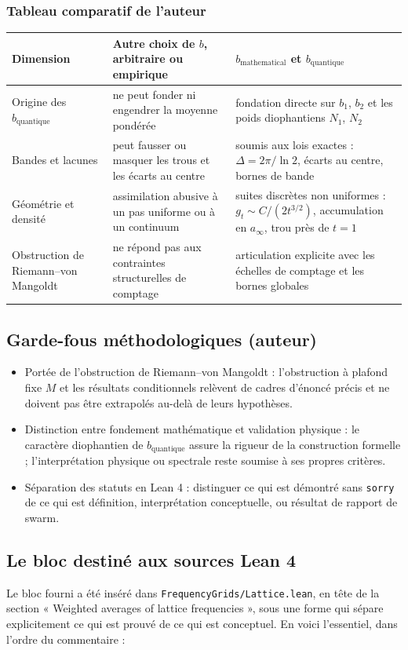 \documentclass[11pt,a4paper]{article}
\newcommand{\code}[1]{\texttt{#1}}
\newcommand{\itemization}[1]{\begin{itemize}[leftmargin=1.4em,itemsep=1pt,topsep=2pt]#1\end{itemize}}
\theoremstyle{definition}
\theoremstyle{remark}
\begin{document}
\subsubsection*{Tableau comparatif de l'auteur}
\begingroup\small
\begin{longtable}{@{}p{3.0cm}p{5.6cm}p{6.5cm}@{}}
\toprule
\textbf{Dimension} & \textbf{Autre choix de $b$, arbitraire ou empirique} & \textbf{$b_{\mathrm{mathematical}}$ et $b_{\mathrm{quantique}}$} \\
\midrule\endhead
Origine des $b_{\mathrm{quantique}}$ & ne peut fonder ni engendrer la moyenne pondérée & fondation directe sur $b_1$, $b_2$ et les poids diophantiens $N_1$, $N_2$ \\
Bandes et lacunes & peut fausser ou masquer les trous et les écarts au centre & soumis aux lois exactes : $\Delta = 2\pi/\ln 2$, écarts au centre, bornes de bande \\
Géométrie et densité & assimilation abusive à un pas uniforme ou à un continuum & suites discrètes non uniformes : $g_t \sim C/(2t^{3/2})$, accumulation en $a_\infty$, trou près de $t = 1$ \\
Obstruction de Riemann--von Mangoldt & ne répond pas aux contraintes structurelles de comptage & articulation explicite avec les échelles de comptage et les bornes globales \\
\bottomrule
\end{longtable}\endgroup

\subsection{Garde-fous méthodologiques (auteur)}
\itemization{
\item Portée de l'obstruction de Riemann--von Mangoldt : l'obstruction à plafond fixe $M$ et les résultats conditionnels relèvent de cadres d'énoncé précis et ne doivent pas être extrapolés au-delà de leurs hypothèses.
\item Distinction entre fondement mathématique et validation physique : le caractère diophantien de $b_{\mathrm{quantique}}$ assure la rigueur de la construction formelle ; l'interprétation physique ou spectrale reste soumise à ses propres critères.
\item Séparation des statuts en Lean 4 : distinguer ce qui est démontré sans \code{sorry} de ce qui est définition, interprétation conceptuelle, ou résultat de rapport de swarm.
}

\subsection{Le bloc destiné aux sources Lean 4}
Le bloc fourni a été inséré dans \code{FrequencyGrids/Lattice.lean}, en tête de la section « Weighted averages of lattice frequencies », sous une forme qui sépare explicitement ce qui est prouvé de ce qui est conceptuel. En voici l'essentiel, dans l'ordre du commentaire :
\end{document}
